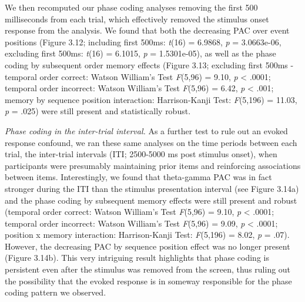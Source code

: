 We then recomputed our phase coding analyses removing the first 500
milliseconds from each trial, which effectively removed the stimulus
onset response from the analysis. We found that both the decreasing PAC
over event positions (Figure 3.12; including first 500ms: \emph{t}(16) =
6.9868, \emph{p} = 3.0663e-06, excluding first 500ms: \emph{t}(16) =
6.1015, \emph{p} = 1.5301e-05), as well as the phase coding by
subsequent order memory effects (Figure 3.13; excluding first 500ms -
temporal order correct: Watson William's Test \emph{F}(5,96) = 9.10,
\emph{p} \textless{} .0001; temporal order incorrect: Watson William's
Test \emph{F}(5,96) = 6.42, \emph{p} \textless{} .001; memory by
sequence position interaction: Harrison-Kanji Test: \emph{F}(5,196) =
11.03, \emph{p} = .025) were still present and statistically robust.

\emph{Phase coding in the inter-trial interval.} As a further test to
rule out an evoked response confound, we ran these same analyses on the
time periods between each trial, the inter-trial intervals (ITI;
2500-5000 ms post stimulus onset), when participants were presumably
maintaining prior items and reinforcing associations between items.
Interestingly, we found that theta-gamma PAC was in fact stronger during
the ITI than the stimulus presentation interval (see Figure 3.14a) and
the phase coding by subsequent memory effects were still present and
robust (temporal order correct: Watson William's Test \emph{F}(5,96) =
9.10, \emph{p} \textless{} .0001; temporal order incorrect: Watson
William's Test \emph{F}(5,96) = 9.09, \emph{p} \textless{} .0001;
position x memory interaction: Harrison-Kanji Test: \emph{F}(5,196) =
8.02, \emph{p} = .07). However, the decreasing PAC by sequence position
effect was no longer present (Figure 3.14b). This very intriguing result
highlights that phase coding is persistent even after the stimulus was
removed from the screen, thus ruling out the possibility that the evoked
response is in someway responsible for the phase coding pattern we
observed.

